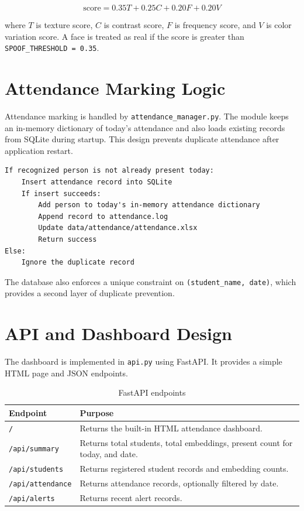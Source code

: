 \documentclass[12pt,a4paper]{report}
\newcommand{\JustifiedNormal}{\fontsize{12}{14}\selectfont\justifying\setlength{\parindent}{0pt}}
\begin{document}
\[
\text{score} =
0.35T + 0.25C + 0.20F + 0.20V
\]

where \(T\) is texture score, \(C\) is contrast score, \(F\) is frequency score, and \(V\) is color variation score. A face is treated as real if the score is greater than \texttt{SPOOF\_THRESHOLD = 0.35}.

\section{Attendance Marking Logic}
\JustifiedNormal
Attendance marking is handled by \texttt{attendance\_manager.py}. The module keeps an in-memory dictionary of today's attendance and also loads existing records from SQLite during startup. This design prevents duplicate attendance after application restart.

\begin{lstlisting}[caption={Attendance marking logic}]
If recognized person is not already present today:
    Insert attendance record into SQLite
    If insert succeeds:
        Add person to today's in-memory attendance dictionary
        Append record to attendance.log
        Update data/attendance/attendance.xlsx
        Return success
Else:
    Ignore the duplicate record
\end{lstlisting}

The database also enforces a unique constraint on \texttt{(student\_name, date)}, which provides a second layer of duplicate prevention.

\section{API and Dashboard Design}
\JustifiedNormal
The dashboard is implemented in \texttt{api.py} using FastAPI. It provides a simple HTML page and JSON endpoints.

\begin{longtable}{|p{}|p{}|}
\caption{FastAPI endpoints}\\
\hline
\textbf{Endpoint} & \textbf{Purpose}\\
\hline
\texttt{/} & Returns the built-in HTML attendance dashboard.\\
\hline
\texttt{/api/summary} & Returns total students, total embeddings, present count for today, and date.\\
\hline
\texttt{/api/students} & Returns registered student records and embedding counts.\\
\hline
\texttt{/api/attendance} & Returns attendance records, optionally filtered by date.\\
\hline
\texttt{/api/alerts} & Returns recent alert records.\\
\hline
\end{longtable}
\end{document}
